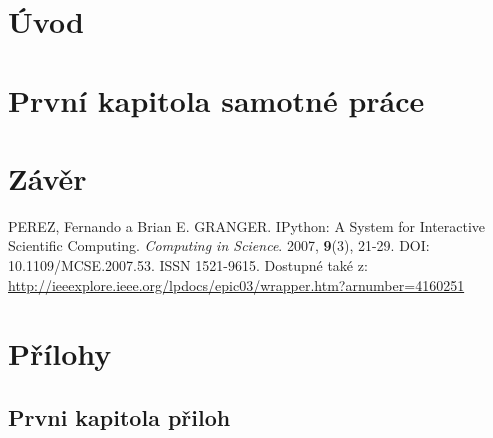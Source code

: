 \documentclass[12pt, a4paper]{article}
\numberwithin{equation}{section} 	%
\begin{document}

\newpage
\section*{Úvod}
\noindent


\newpage
\section{První kapitola samotné práce}
\noindent


\newpage
\section{Závěr}
\noindent

\newpage
\begin{thebibliography}{99}
PEREZ, Fernando a Brian E. GRANGER. IPython: A System for Interactive Scientific Computing. \textit{Computing in Science}. 2007, \textbf{9}(3), 21-29. DOI: 10.1109/MCSE.2007.53. ISSN 1521-9615. Dostupné také z: \url{http://ieeexplore.ieee.org/lpdocs/epic03/wrapper.htm?arnumber=4160251}
\end{thebibliography}

\newpage
\section*{Přílohy}
\subsection*{Prvni kapitola přiloh}
\noindent
\end{document}
